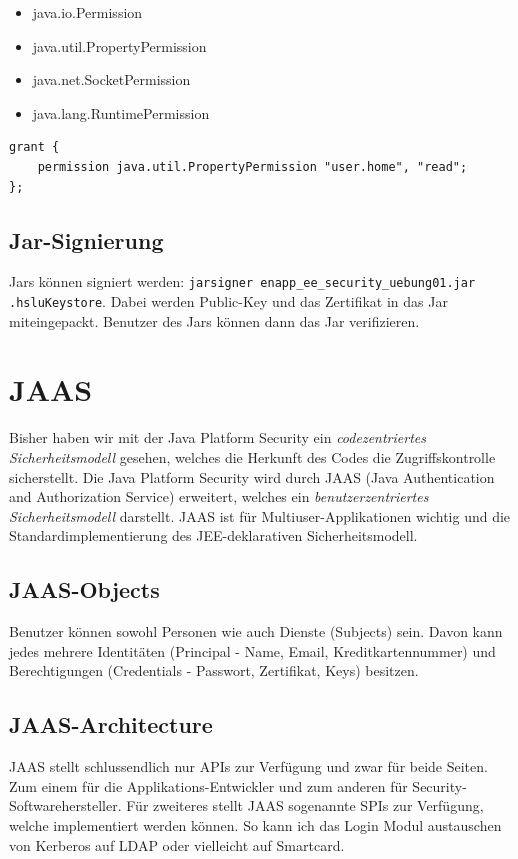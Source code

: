 \begin{multicols}{2}
\begin{itemize}
	\item java.io.Permission
	\item java.util.PropertyPermission
	\item java.net.SocketPermission
	\item java.lang.RuntimePermission
\end{itemize}
\end{multicols}

\begin{lstlisting}
grant {
	permission java.util.PropertyPermission "user.home", "read";
};
\end{lstlisting}

\subsection{Jar-Signierung}
Jars können signiert werden: \verb|jarsigner enapp_ee_security_uebung01.jar .hsluKeystore|. Dabei werden Public-Key und das Zertifikat in das Jar miteingepackt. Benutzer des Jars können dann das Jar verifizieren.

\section{JAAS}
Bisher haben wir mit der Java Platform Security ein \emph{codezentriertes Sicherheitsmodell} gesehen, welches die Herkunft des Codes die Zugriffskontrolle sicherstellt. Die Java Platform Security wird durch JAAS (Java Authentication and Authorization Service) erweitert, welches ein \emph{benutzerzentriertes Sicherheitsmodell} darstellt. JAAS ist für Multiuser-Applikationen wichtig und die Standardimplementierung des JEE-deklarativen Sicherheitsmodell.

\subsection{JAAS-Objects}
Benutzer können sowohl Personen wie auch Dienste (Subjects) sein. Davon kann jedes mehrere Identitäten (Principal - Name, Email, Kreditkartennummer) und Berechtigungen (Credentials - Passwort, Zertifikat, Keys) besitzen. 

\subsection{JAAS-Architecture}
JAAS stellt schlussendlich nur APIs zur Verfügung und zwar für beide Seiten. Zum einem für die Applikations-Entwickler und zum anderen für Security-Softwarehersteller. Für zweiteres stellt JAAS sogenannte SPIs zur Verfügung, welche implementiert werden können. So kann ich das Login Modul austauschen von Kerberos auf LDAP oder vielleicht auf Smartcard.

